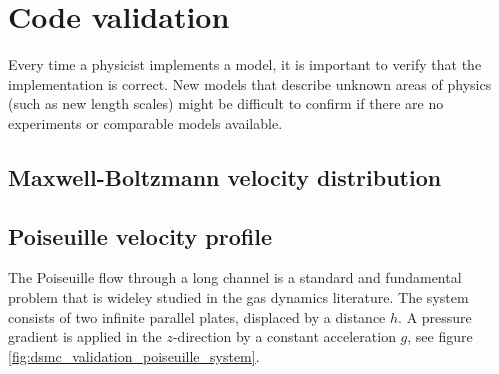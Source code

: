 \section{Code validation}
Every time a physicist implements a model, it is important to verify that the implementation is correct. New models that describe unknown areas of physics (such as new length scales) might be difficult to confirm if there are no experiments or comparable models available. 
\subsection{Maxwell-Boltzmann velocity distribution}


\subsection{Poiseuille velocity profile}
\label{sec:dsmc_validation_poiseuille}
The Poiseuille flow through a long channel is a standard and fundamental problem that is wideley studied in the gas dynamics literature. The system consists of two infinite parallel plates, displaced by a distance $h$. A pressure gradient is applied in the $z$-direction by a constant acceleration $g$, see figure \ref{fig:dsmc_validation_poiseuille_system}. 

